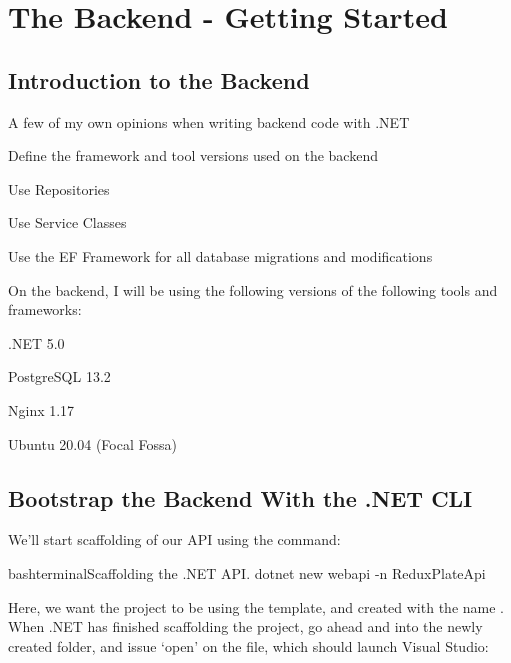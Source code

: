 \documentclass[a4paper,headinclude=on,footinclude=on,12pt,oneside]{scrbook}
\begin{document}
\chapter{The Backend - Getting Started}

\section{Introduction to the Backend}
\begin{arrows}
\item A few of my own opinions when writing backend code with .NET
\item Define the framework and tool versions used on the backend
\end{arrows}


\begin{arrows}
\item Use Repositories 
\item Use Service Classes
\item Use the EF Framework for all database migrations and modifications
\end{arrows}


On the backend, I will be using the following versions of the following tools and frameworks:

\begin{arrows}
\item .NET 5.0
\item PostgreSQL 13.2
\item Nginx 1.17
\item Ubuntu 20.04 (Focal Fossa)
\end{arrows}

\section{Bootstrap the Backend With the .NET CLI}


We'll start scaffolding of our API using the  command:

\begin{codeInput}{bash}{terminal}{Scaffolding the .NET API.}
dotnet new webapi -n ReduxPlateApi
\end{codeInput}

Here, we want the project to be using the  template, and created with the name . When .NET has finished scaffolding the project, go ahead and  into the newly created  folder, and issue `open' on the  file, which should launch Visual Studio:
\end{document}
